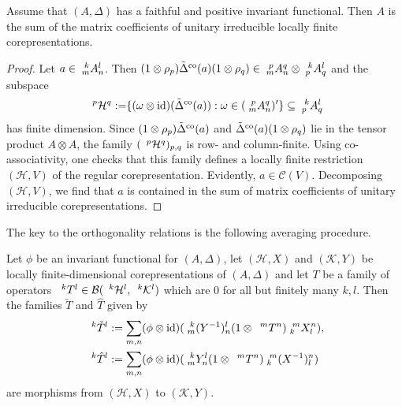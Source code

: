 \begin{Prop} \label{prop:rep-weak-pw}
  Assume that $(A,\Delta)$ has a faithful and positive invariant
  functional. Then $A$ is the sum of the matrix coefficients of
unitary  irreducible locally finite corepresentations.
\end{Prop}
\begin{proof}
  Let $a \in \Gr{A}{k}{l}{m}{n}$. Then
  $(1 \otimes \rho_{p})\tilde \Delta^{\co}(a)(1 \otimes \rho_{q}) \in
  \Gr{A}{p}{q}{m}{n} \otimes \Gr{A}{k}{l}{p}{q}$ and the subspace
    \begin{align*}
    \Gru{\mathcal{H}}{p}{q} &:= \span \{ (\omega \otimes \id)(\tilde
    \Delta^{\co}(a)) : \omega \in (\Gr{A}{p}{q}{m}{n})' \} \subseteq
    \Gr{A}{k}{l}{p}{q}
  \end{align*}
  has finite dimension. Since $(1 \otimes \rho_{p})\tilde
  \Delta^{\co}(a)$ and $\tilde \Delta^{\co}(a)(1 \otimes \rho_{q})$
  lie in the tensor product $A \otimes A$, the family
  $(\Gru{\mathcal{H}}{p}{q})_{p,q}$ is row- and column-finite. Using
  co-associativity, one checks that this family defines a locally
  finite restriction $(\mathcal{H},V)$ of the regular
  corepresentation. Evidently, $a \in \mathcal{C}(V)$. Decomposing
  $(\mathcal{H},V)$, we find that
  $a$ is contained in the sum of matrix coefficients of unitary
  irreducible corepresentations.
\end{proof}
The key to the orthogonality relations is the following averaging procedure.
\begin{Lem} \label{lem:rep-average}
  Let $\phi$ be an invariant functional for $(A,\Delta)$, let
  $(\mathcal{H},X)$ and $(\mathcal{K},Y)$ be locally
  finite-dimensional corepresentations of $(A,\Delta)$ and let $T$ be
  a family of operators $\Gru{T}{k}{l} \in
  \mathcal{B}(\Gru{\mathcal{H}}{k}{l},\Gru{\mathcal{K}}{k}{l})$ which
  are $0$ for all but finitely many $k,l$. Then the families $\check T$ and
  $\hat T$ given by
  \begin{align*}
    \Gru{\check T}{k}{l} &:= \sum_{m,n} (\phi \otimes
    \id)(\Gr{(Y^{-1})}{k}{l}{m}{n}(1\otimes
    \Gru{T}{m}{n})\Gr{X}{m}{n}{k}{l}), \\
    \Gru{\hat T}{k}{l} &:= \sum_{m,n} (\phi \otimes
    \id)(\Gr{Y}{k}{l}{m}{n}(1\otimes
    \Gru{T}{m}{n})\Gr{(X^{-1})}{m}{n}{k}{l})
  \end{align*}
  are morphisms from $(\mathcal{H},X)$ to $(\mathcal{K},Y)$.
\end{Lem}
